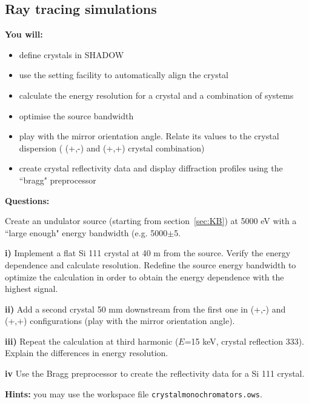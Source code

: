 \subsection{Ray tracing simulations}

\begin{youwillbox}
\textbf{You will:}

\begin{itemize}
    \item define crystals in SHADOW
    \item use the setting facility to automatically align the crystal
    \item calculate the energy resolution for a crystal and a combination of systems
    \item optimise the source bandwidth
    \item play with the mirror orientation angle. Relate its values to the crystal dispersion ( (+,-) and (+,+) crystal combination)
    \item create crystal reflectivity data and display diffraction profiles using the ``bragg" preprocessor
\end{itemize}
\end{youwillbox}

\begin{questionsbox}
\textbf{Questions:}

Create an undulator source (starting from section~\ref{sec:KB}) at 5000 eV with a ``large enough" energy bandwidth (e.g. 5000$\pm$5.

\textbf{i)} Implement a flat Si 111 crystal at 40 m from the source. Verify the energy dependence and calculate resolution. Redefine the source energy bandwidth to optimize the calculation in order to obtain the energy dependence with the highest signal.

\textbf{ii)} Add a second crystal 50 mm downstream from the first one in (+,-) and (+,+) configurations (play with the mirror orientation angle).

\textbf{iii)} Repeat the calculation at third harmonic ($E$=15 keV, crystal reflection 333). Explain the differences in energy resolution.

\textbf{iv} Use the Bragg preprocessor to create the reflectivity data for a Si 111 crystal.
\end{questionsbox}

\begin{hintsbox}
\textbf{Hints:} you may use the workspace file {\tt crystalmonochromators.ows}.
\end{hintsbox}

